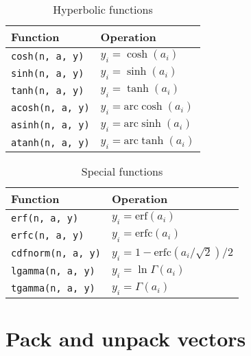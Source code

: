 \begin{table}
  \begin{tabularx}{\textwidth}{LL}
    \toprule
    Function & Operation \\
    \midrule
    \verb|cosh(n, a, y)|  & $y_i = \cosh(a_i)$             \\
    \verb|sinh(n, a, y)|  & $y_i = \sinh(a_i)$             \\
    \verb|tanh(n, a, y)|  & $y_i = \tanh(a_i)$             \\
    \verb|acosh(n, a, y)| & $y_i = \mathrm{arc}\cosh(a_i)$ \\
    \verb|asinh(n, a, y)| & $y_i = \mathrm{arc}\sinh(a_i)$ \\
    \verb|atanh(n, a, y)| & $y_i = \mathrm{arc}\tanh(a_i)$ \\
    \bottomrule
  \end{tabularx}
  \caption{Hyperbolic functions}
  \label{tab:Hyperbolic functions}
\end{table}

\begin{table}
  \begin{tabularx}{\textwidth}{LL}
    \toprule
    Function & Operation \\
    \midrule
    \verb|erf(n, a, y)|     & $y_i = \mathrm{erf}(a_i)$                     \\
    \verb|erfc(n, a, y)|    & $y_i = \mathrm{erfc}(a_i)$                    \\
    \verb|cdfnorm(n, a, y)| & $y_i = 1 - \mathrm{erfc}(a_i / \sqrt{2}) / 2$ \\
    \verb|lgamma(n, a, y)|  & $y_i = \ln\Gamma(a_i)$                        \\
    \verb|tgamma(n, a, y)|  & $y_i = \Gamma(a_i)$                           \\
    \bottomrule
  \end{tabularx}
  \caption{Special functions}
  \label{tab:Special functions}
\end{table}

\section{Pack and unpack vectors}
\label{sec:Pack and unpack vectors}

